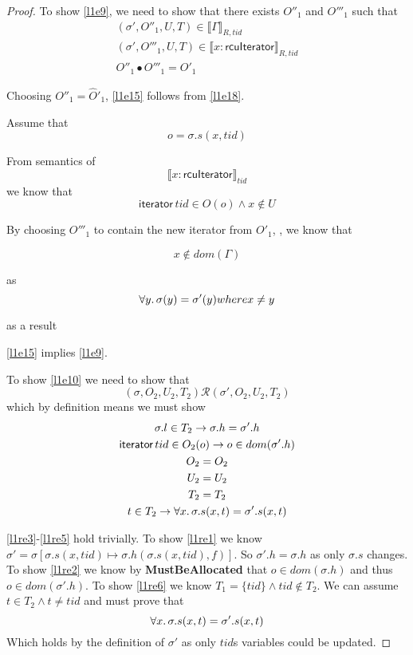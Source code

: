 \begin{proof}
To show \ref{l1e9}, we need to show that there exists $O''_{1}$ and $O'''_{1}$ such that
\begin{gather} \label{l1e15}
(\sigma',O''_{1}, U, T) \in \llbracket \Gamma \rrbracket_{R,tid}
\\
 \label{l1e16}
(\sigma',O'''_{1}, U, T) \in \llbracket x:\textsf{rcuIterator} \rrbracket_{R,tid}
\\
 \label{l1e17}
O''_{1} \bullet O'''_{1} = O'_{1}
\end{gather}

Choosing $O''_{1} = \hat{O}'_{1}$, \ref{l1e15} follows  from \ref{l1e18}.

Assume that \[ o = \sigma.s(x,tid)\]

From semantics of \[ \llbracket x:\mathsf{rcuIterator} \rrbracket_{tid} \] we know that \[ \mathsf{iterator} \, tid \in O(o) \land x\notin U \]

By choosing $O'''_{1}$ to contain the new iterator from $O'_{1}$, , we know that

\[ x \notin dom(\Gamma) \]

as \[ \forall y \ldotp \sigma(y) = \sigma'(y) where x \neq y \]

as a result  

\ref{l1e15} implies \ref{l1e9}.

To show \ref{l1e10} we need to show that
\[
(\sigma, O_{2}, U_{2}, T_{2}) \mathcal{R} (\sigma', O_{2}, U_{2}, T_{2})
\]
which by definition means we must show
\begin{gather}
\label{l1re1}
\sigma.l \in T_{2} \rightarrow \sigma.h = \sigma'.h
\\
\label{l1re2}
\textsf{iterator} \, tid \in O_{2}(o) \rightarrow  o \in dom(\sigma'.h)
\\
\label{l1re3}
O_{2} = O_{2}
\\
\label{l1re4}
U_{2} = U_{2}
\\
\label{l1re5}
T_{2} = T_{2}
\\
\label{l1re6}
t \in T_{2} \rightarrow \forall x \ldotp \sigma.s(x,t) = \sigma'.s(x,t)
\end{gather}

\ref{l1re3}-\ref{l1re5} hold trivially. To show \ref{l1re1} we know $\sigma' = \sigma [  \sigma.s(x,tid) \mapsto \sigma.h(\sigma.s(x,tid),f)  ]$. So $\sigma'.h = \sigma.h$ as only $\sigma.s$ changes. To show \ref{l1re2} we know by \textsf{\textbf{MustBeAllocated}} that $o \in dom(\sigma.h)$ and thus $o \in dom(\sigma'.h)$. To show \ref{l1re6} we know $T_{1} = \{tid\} \land tid \notin T_{2}$.  We can assume $t \in T_{2} \land t \ne tid$ and must prove that 
\[
\forall x \ldotp \sigma.s(x,t) = \sigma'.s(x,t) 
\]
Which holds by the definition of $\sigma'$ as only $tid$s variables could be updated. 


\end{proof}
